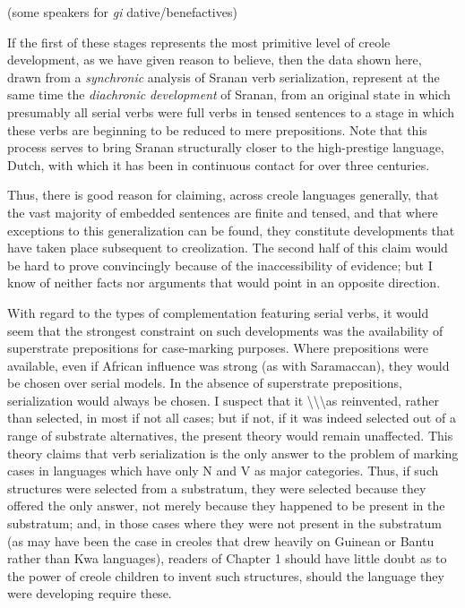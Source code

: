 (some speakers for \textit{gi} dative/benefactives)

If the first of these stages represents the most primitive level of creole development, as we have given reason to believe, then the data shown here, drawn from a \textit{synchronic} analysis of Sranan verb serialization, represent at the same time the \textit{diachronic} \textit{development} of Sranan, from an original state in which presumably all serial verbs were full verbs in tensed sentences to a stage in which these verbs are beginning to be reduced to mere prepositions. Note that this process serves to bring Sranan structurally closer to the high-prestige language, Dutch, with which it has been in continuous contact for over three centuries.

Thus, there is good reason for claiming, across creole languages generally, that the vast majority of embedded sentences are finite and tensed, and that where exceptions to this generalization can be found, they constitute developments that have taken place subsequent to creolization. The second half of this claim would be hard to prove con\-vincingly because of the inaccessibility of evidence; but I know of neither facts nor arguments that would point in an opposite direction.

With regard to the types of complementation featuring serial verbs, it would seem that the strongest constraint on such develop\-ments was the availability of superstrate prepositions for case-marking purposes. Where prepositions were available, even if African influence was strong (as with Saramaccan), they would be chosen over serial models. In the absence of superstrate prepositions, serialization would always be chosen. I suspect that it {\textbackslash}{\textbackslash}{\textbackslash}as reinvented, rather than selected,
in most if not all cases; but if not, if it was indeed selected out of a range of substrate alternatives, the present theory would remain un\-affected. This theory claims that verb serialization is the only answer to the problem of marking cases in languages which have only N and V as major categories. Thus, if such structures were selected from a substratum, they were selected because they offered the only answer, not merely because they happened to be present in the substratum; and, in those cases where they were not present in the substratum (as may have been the case in creoles that drew heavily on Guinean or Bantu rather than Kwa languages), readers of Chapter 1 should have little doubt as to the power of creole children to invent such structures, should the language they were developing require these.

